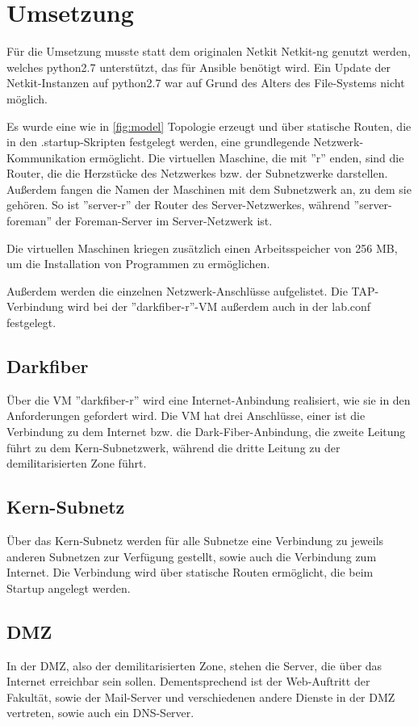 \chapter{Umsetzung}

Für die Umsetzung musste statt dem originalen Netkit Netkit-ng genutzt werden, welches python2.7 unterstützt, das für Ansible benötigt wird. Ein Update der Netkit-Instanzen auf python2.7 war auf Grund des Alters des File-Systems nicht möglich.

Es wurde eine wie in \ref{fig:model} Topologie erzeugt und über statische Routen, die in den .startup-Skripten festgelegt werden, eine grundlegende Netzwerk-Kommunikation ermöglicht. 
Die virtuellen Maschine, die mit ''r'' enden, sind die Router, die die Herzstücke des Netzwerkes bzw. der Subnetzwerke darstellen. 
Außerdem fangen die Namen der Maschinen mit dem Subnetzwerk an, zu dem sie gehören. 
So ist ''server-r'' der Router des Server-Netzwerkes, während ''server-foreman'' der Foreman-Server im Server-Netzwerk ist.

Die virtuellen Maschinen kriegen zusätzlich einen Arbeitsspeicher von 256 MB, um die Installation von Programmen zu ermöglichen.

Außerdem werden die einzelnen Netzwerk-Anschlüsse aufgelistet. Die TAP-Verbindung wird bei der ''darkfiber-r''-VM außerdem auch in der lab.conf festgelegt.

\section{Darkfiber}
Über die VM ''darkfiber-r'' wird eine Internet-Anbindung realisiert, wie sie in den Anforderungen gefordert wird. Die VM hat drei Anschlüsse, einer ist die Verbindung zu dem Internet bzw. die Dark-Fiber-Anbindung, die zweite Leitung führt zu dem Kern-Subnetzwerk, während die dritte Leitung zu der demilitarisierten Zone führt.

\section{Kern-Subnetz}
Über das Kern-Subnetz werden für alle Subnetze eine Verbindung zu jeweils anderen Subnetzen zur Verfügung gestellt, sowie auch die Verbindung zum Internet. Die Verbindung wird über statische Routen ermöglicht, die beim Startup angelegt werden.

\section{DMZ}
In der DMZ, also der demilitarisierten Zone, stehen die Server, die über das Internet erreichbar sein sollen. Dementsprechend ist der Web-Auftritt der Fakultät, sowie der Mail-Server und verschiedenen andere Dienste in der DMZ vertreten, sowie auch ein DNS-Server.

